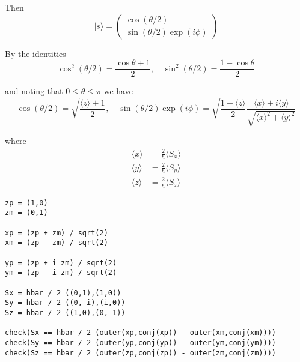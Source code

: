 Then
\begin{equation*}
|s\rangle=\begin{pmatrix}\cos(\theta/2)\\\sin(\theta/2)\exp(i\phi)\end{pmatrix}
\end{equation*}

By the identities
\begin{equation*}
\cos^2(\theta/2)=\frac{\cos\theta+1}{2},\quad
\sin^2(\theta/2)=\frac{1-\cos\theta}{2}
\end{equation*}

and noting that $0\le\theta\le\pi$ we have
\begin{equation*}
\cos(\theta/2)=\sqrt{\frac{\langle z\rangle+1}{2}},\quad
\sin(\theta/2)\exp(i\phi)=\sqrt{\frac{1-\langle z\rangle}{2}}
\frac{\langle x\rangle+i\langle y\rangle}{\sqrt{\langle x\rangle^2+\langle y\rangle^2}}
\end{equation*}

where
\begin{align*}
\langle x\rangle&=\tfrac{2}{\hbar}\langle S_x\rangle
\\
\langle y\rangle&=\tfrac{2}{\hbar}\langle S_y\rangle
\\
\langle z\rangle&=\tfrac{2}{\hbar}\langle S_z\rangle
\end{align*}

\newpage
{}

{\footnotesize\begin{verbatim}
zp = (1,0)
zm = (0,1)

xp = (zp + zm) / sqrt(2)
xm = (zp - zm) / sqrt(2)

yp = (zp + i zm) / sqrt(2)
ym = (zp - i zm) / sqrt(2)

Sx = hbar / 2 ((0,1),(1,0))
Sy = hbar / 2 ((0,-i),(i,0))
Sz = hbar / 2 ((1,0),(0,-1))

check(Sx == hbar / 2 (outer(xp,conj(xp)) - outer(xm,conj(xm))))
check(Sy == hbar / 2 (outer(yp,conj(yp)) - outer(ym,conj(ym))))
check(Sz == hbar / 2 (outer(zp,conj(zp)) - outer(zm,conj(zm))))
\end{verbatim}}

